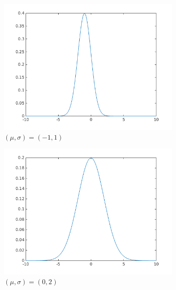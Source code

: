 \documentclass{article}
\begin{document}
\begin{figure}[h!]
    \centering
    \begin{subfigure}[b]{0.5\textwidth}
        \includegraphics[width=\textwidth]{part1/I211.png}
        \caption{$(\mu, \sigma) = (-1,1)$}
    \end{subfigure}%
    \begin{subfigure}[b]{0.5\textwidth}
        \includegraphics[width=\textwidth]{part1/I212.png}
        \caption{$(\mu, \sigma) = (0,2)$}
    \end{subfigure}
    \begin{subfigure}[b]{0.5\textwidth}

\end{subfigure}
\end{figure}
\end{document}
